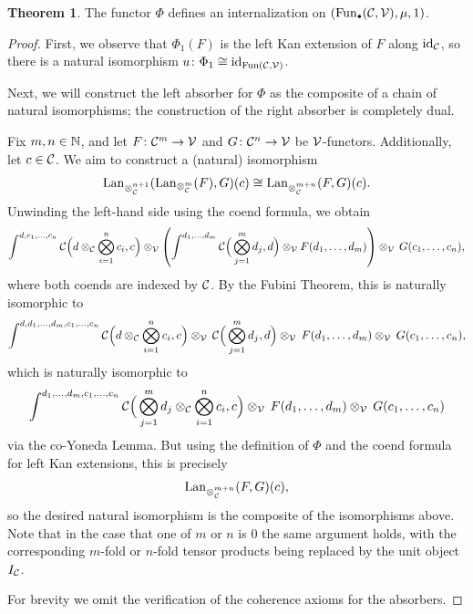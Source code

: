 \documentclass[openany, amssymb, psamsfonts]{amsart}
\theoremstyle{definition}
\newtheorem{thm}{Theorem}[section]
\numberwithin{equation}{section}
\begin{document}
\begin{thm}
The functor $\Phi$ defines an internalization on $(\Fun_\sbull(\C, \V), \mu, 1)$.
\end{thm}
\begin{proof}
First, we observe that $\Phi_1(F)$ is the left Kan extension of $F$ along $\mathrm{id}_{\mathcal{C}}$, so there is a natural isomorphism $u \colon \Phi_1 \cong \mathrm{id}_{\operatorname{Fun}(\mathcal{C}, \mathcal{V})}$. 

Next, we will construct the left absorber for $\Phi$ as the composite of a chain of natural isomorphisms; the construction of the right absorber is completely dual.

Fix $m, n \in \mathbb{N}$, and let $F \colon \mathcal{C}^m \to \mathcal{V}$ and $G \colon \mathcal{C}^n \to \mathcal{V}$ be $\mathcal{V}$-functors. Additionally, let $c \in \mathcal{C}$. We aim to construct a (natural) isomorphism
\begin{equation*}
    \operatorname{Lan}_{\otimes_{\mathcal{C}}^{n + 1}}(\operatorname{Lan}_{\otimes^m_{\mathcal{C}}}(F), G)(c) \cong \operatorname{Lan}_{\otimes_{\mathcal{C}}^{m + n}}(F, G)(c).
\end{equation*} Unwinding the left-hand side using the coend formula, we obtain
\begin{equation*}
    \int^{d, c_1, \dots, c_n} \mathcal{C}\Big(d \otimes_{\mathcal{C}} \bigotimes_{i = 1}^n c_i, c\Big) \otimes_{\mathcal{V}} \left(\int^{d_1, \dots, d_m} \mathcal{C}\Big(\bigotimes_{j = 1}^m d_j, d\Big) \otimes_{\mathcal{V}} F(d_1, \dots, d_m)\right) \otimes_{\mathcal{V}} \hspace{0.2em}G(c_1, \dots, c_n),
\end{equation*} where both coends are indexed by $\mathcal{C}$. By the Fubini Theorem, this is naturally isomorphic to
\begin{equation*}
    \int^{d, d_1, \dots, d_m, c_1, \dots, c_n} \mathcal{C}\Big(d \otimes_{\mathcal{C}} \bigotimes_{i = 1}^n c_i, c\Big) \otimes_{\mathcal{V}} \hspace{0.2em} \mathcal{C}\Big(\bigotimes_{j = 1}^m d_j, d\Big) \otimes_{\mathcal{V}}\hspace{0.2em} F(d_1, \dots, d_m) \otimes_{\mathcal{V}} \hspace{0.2em}G(c_1, \dots, c_n),
\end{equation*} which is naturally isomorphic to
\begin{equation*}
    \int^{d_1, \dots, d_m, c_1, \dots, c_n} \mathcal{C}\Big(\bigotimes_{j = 1}^m d_j \otimes_{\mathcal{C}} \bigotimes_{i = 1}^n c_i, c\Big)  \otimes_{\mathcal{V}} \hspace{0.2em} F(d_1, \dots, d_m) \otimes_{\mathcal{V}} \hspace{0.2em}G(c_1, \dots, c_n)
\end{equation*} via the co-Yoneda Lemma. But using the definition of $\Phi$ and the coend formula for left Kan extensions, this is precisely
\begin{equation*}
    \operatorname{Lan}_{\otimes_{\mathcal{C}}^{m + n}}(F, G)(c),
\end{equation*} so the desired natural isomorphism is the composite of the isomorphisms above. Note that in the case that one of $m$ or $n$ is $0$ the same argument holds, with the corresponding $m$-fold or $n$-fold tensor products being replaced by the unit object $I_{\mathcal{C}}$.

For brevity we omit the verification of the coherence axioms for the absorbers.
\end{proof}
\end{document}
